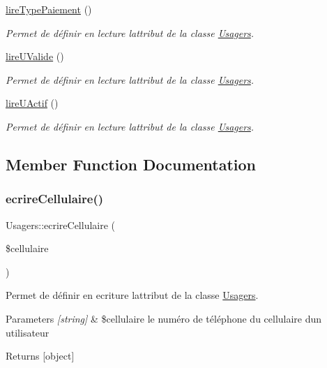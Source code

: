 \begin{DoxyCompactItemize}
\hyperlink{class_usagers_a6e9ddd8b6387c964af5c87d0b02cbb1b}{lire\+Type\+Paiement} ()
\begin{DoxyCompactList}\small\item\em Permet de définir en lecture l\textquotesingle{}attribut de la classe \hyperlink{class_usagers}{Usagers}. \end{DoxyCompactList}\item 
\hyperlink{class_usagers_aaea70589f511b5d23652b6384b336fd2}{lire\+U\+Valide} ()
\begin{DoxyCompactList}\small\item\em Permet de définir en lecture l\textquotesingle{}attribut de la classe \hyperlink{class_usagers}{Usagers}. \end{DoxyCompactList}\item 
\hyperlink{class_usagers_a3d31ec0f8b717fbe1d6e559319f9cc92}{lire\+U\+Actif} ()
\begin{DoxyCompactList}\small\item\em Permet de définir en lecture l\textquotesingle{}attribut de la classe \hyperlink{class_usagers}{Usagers}. \end{DoxyCompactList}\end{DoxyCompactItemize}


\subsection{Member Function Documentation}
\mbox{\label{class_usagers_a9d555a378de66afd36db65608e43b0e2}} 
\subsubsection{\texorpdfstring{ecrire\+Cellulaire()}{ecrireCellulaire()}}
{\footnotesize\ttfamily Usagers\+::ecrire\+Cellulaire (\begin{DoxyParamCaption}\item[{}]{\$cellulaire }\end{DoxyParamCaption})}



Permet de définir en ecriture l\textquotesingle{}attribut de la classe \hyperlink{class_usagers}{Usagers}. 


\begin{DoxyParams}{Parameters}
{\em \mbox{[}string\mbox{]}} & \$cellulaire le numéro de téléphone du cellulaire d\textquotesingle{}un utilisateur \\
\hline
\end{DoxyParams}
\begin{DoxyReturn}{Returns}
\mbox{[}object\mbox{]} 
\end{DoxyReturn}
\mbox{\label{class_usagers_aed3eb1a56858fc14f6440f5784eee91c}} 
